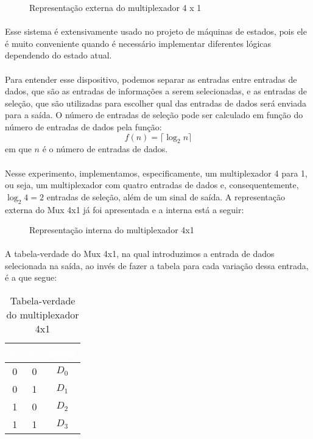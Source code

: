 \documentclass[a4paper,12pt]{article}
\begin{document}
\begin{figure}[H]
    \centering
    
    \caption{Representação externa do multiplexador 4 x 1}
    \label{fig:Mux_externa}
\end{figure}

\paragraph{}
Esse sistema é extensivamente usado no projeto de máquinas de estados, pois ele é muito conveniente quando é necessário implementar diferentes lógicas dependendo do estado atual.

\newpage
\paragraph{}
Para entender esse dispositivo, podemos separar as entradas entre entradas de dados, que são as entradas de informações a serem selecionadas, e as entradas de seleção, que são utilizadas para escolher qual das entradas de dados será enviada para a saída. O número de entradas de seleção pode ser calculado em função do número de entradas de dados pela função: 
\[
f(n) = \lceil \log_2n \rceil
\]
em que $n$ é o número de entradas de dados.

\paragraph{}
Nesse experimento, implementamos, especificamente, um multiplexador 4 para 1, ou seja, um multiplexador com quatro entradas de dados e, consequentemente, $\log_2 4 = 2$ entradas de seleção, além de um sinal de saída. A representação externa do Mux 4x1 já foi apresentada e a interna está a seguir:

\begin{figure}[H]
    \centering
    
    \caption{Representação interna do multiplexador 4x1}
    \label{fig:Mux_interna}
\end{figure}

\paragraph{}
A tabela-verdade do Mux 4x1, na qual introduzimos a entrada de dados selecionada na saída, ao invés de fazer a tabela para cada variação dessa entrada, é a que segue:

\begin{table}[H]
    \centering
    \begin{tabular}{|c|c|c|}
        \hline
        \rowcolor{black}
        \textcolor{white}{$S_1$} & \textcolor{white}{$S_0$} & \textcolor{white}{Saída} \\ \hline
        0 & 0 & $D_0$ \\ \hline
        \rowcolor{cinza}
        0 & 1 & $D_1$ \\ \hline
        1 & 0 & $D_2$ \\ \hline
        \rowcolor{cinza}
        1 & 1 & $D_3$ \\ \hline
    \end{tabular}
    \caption{Tabela-verdade do multiplexador 4x1}
\end{table}
\end{document}
